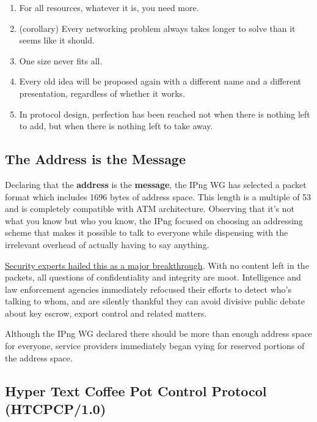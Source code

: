 \documentclass{article}
\begin{document}
\begin{enumerate}
    \item  For all resources, whatever it is, you need more.

    \item (corollary) Every networking problem always takes longer to
            solve than it seems like it should.

    \item One size never fits all.

    \item Every old idea will be proposed again with a different name and
        a different presentation, regardless of whether it works.

    \item In protocol design, perfection has been reached not when there
        is nothing left to add, but when there is nothing left to take
        away. \cite{networkingTruthsAuthors}
       
\end{enumerate}
\subsection {The Address is the Message}
Declaring that the \textbf{address} is the \textbf{message}, the IPng WG has selected a
   packet format which includes 1696 bytes of address space.  This
   length is a multiple of 53 and is completely compatible with ATM
   architecture.  Observing that it's not what you know but who you
   know, the IPng focused on choosing an addressing scheme that makes it
   possible to talk to everyone while dispensing with the irrelevant
   overhead of actually having to say anything.

   \underline{Security experts hailed this as a major breakthrough}.  With no
   content left in the packets, all questions of confidentiality and
   integrity are moot.  Intelligence and law enforcement agencies
   immediately refocused their efforts to detect who's talking to whom,
   and are silently thankful they can avoid divisive public debate about
   key escrow, export control and related matters.

   Although the IPng WG declared there should be more than enough
   address space for everyone, service providers immediately began vying
   for reserved portions of the address space. \cite{theAddressIsTheMessageAuthor}

\subsection{Hyper Text Coffee Pot Control Protocol (HTCPCP/1.0)}
\end{document}
